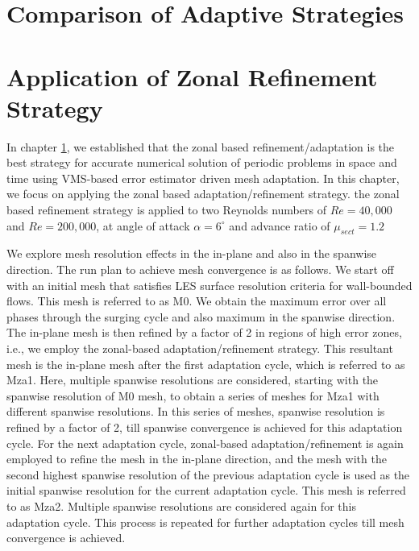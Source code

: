 
\section{Comparison of Adaptive Strategies}
\label{sec:adaptive_strategy_comparison}




\section{Application of Zonal Refinement Strategy}


In chapter \ref{sec:adaptive_strategy_comparison}, we established that the zonal based refinement/adaptation is the best strategy for accurate numerical solution of periodic problems in space and time using VMS-based error estimator driven mesh adaptation. In this chapter, we focus on applying the zonal based adaptation/refinement strategy. the zonal based refinement strategy is applied to two Reynolds numbers of $Re=40,000$ and $Re=200,000$, at angle of attack $\alpha=6^\circ$ and advance ratio of $\mu_{sect}=1.2$

We explore mesh resolution effects in the in-plane and also in the spanwise direction. 
The run plan to achieve mesh convergence is as follows. 
We start off with an initial mesh that satisfies LES surface resolution criteria for wall-bounded flows. This mesh is referred to as M0.
We obtain the maximum error over all phases through the surging cycle and also maximum in the spanwise direction.
The in-plane mesh is then refined by a factor of 2 in regions of high error zones, i.e., we employ the zonal-based adaptation/refinement strategy.
This resultant mesh is the in-plane mesh after the first adaptation cycle, which is referred to as Mza1.
Here, multiple spanwise resolutions are considered, starting with the spanwise resolution of M0 mesh, to obtain a series of meshes for Mza1 with different spanwise resolutions.
In this series of meshes, spanwise resolution is refined by a factor of 2, till spanwise convergence is achieved for this adaptation cycle. 
For the next adaptation cycle, zonal-based adaptation/refinement is again employed to refine the mesh in the in-plane direction, and the mesh with the second highest spanwise resolution of the previous adaptation cycle is used as the initial spanwise resolution for the current adaptation cycle. 
This mesh is referred to as Mza2.
Multiple spanwise resolutions are considered again for this adaptation cycle.
This process is repeated for further adaptation cycles till mesh convergence is achieved.

